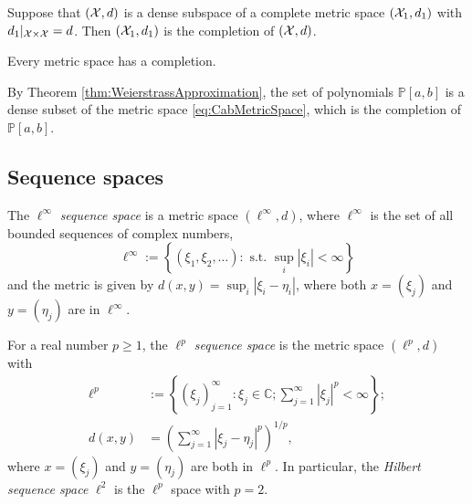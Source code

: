 \begin{lem}
  \label{lem:denseCompletion}
  Suppose that $({\cal X}, d)$ is a dense subspace
  of a complete metric space $({\cal X}_1, d_1)$
  with $d_1|_{{\cal X}\times{\cal X}} = d$.
  Then $({\cal X}_1, d_1)$ is the completion of $({\cal X}, d)$.
\end{lem}

\begin{thm}
  \label{thm:existenceOfMetricCompletion}
  Every metric space has a completion.
\end{thm}

\begin{exm}
  \label{exm:polynomialDenseInCab}
  By Theorem \ref{thm:WeierstrassApproximation}, 
  the set of polynomials $\mathbb{P}[a,b]$
  is a dense subset of the metric space \eqref{eq:CabMetricSpace}, 
  which is the completion of $\mathbb{P}[a,b]$.
\end{exm}

\subsection{Sequence spaces}
\label{sec:metric-spaces-basicAnal}

\begin{defn}
  \label{def:lInftySeqSpace}
  The $\ell^{\infty}$ \emph{sequence space} 
  is a metric space $(\ell^{\infty},d)$,
  where $\ell^{\infty}$ is the set of all bounded sequences
  of complex numbers,
  \begin{equation}
    \label{eq:ellInftySpace}
    \ell^{\infty} := \left\{
      (\xi_1, \xi_2, \ldots):
      \text{ s.t. } \sup_{i}|\xi_i| < \infty
      \right\}
  \end{equation}
  and the metric is given by
  $d(x,y) = \sup_{i}|\xi_i- \eta_i|$, 
  where both $x=(\xi_j)$ and $y=(\eta_j)$ are in $\ell^{\infty}$. 
\end{defn}

\begin{defn}
  \label{def:lpSpace}
  For a real number $p\ge 1$,
   the \emph{$\ell^p$ sequence space} is the metric space $(\ell^p, d)$
   with
  \begin{align}
    \label{eq:lpSpace}
    \ell^p &:= \left\{
               (\xi_j)_{j=1}^{\infty}: \xi_j\in \mathbb{C};
               \sum_{j=1}^{\infty} |\xi_j|^p < \infty
    \right\};
    \\
    \label{eq:lpMetric}
    d(x,y) &= \left(\sum_{j=1}^{\infty} |\xi_j -\eta_j|^p\right)^{1/p},
  \end{align}             
  where $x=(\xi_j)$ and $y=(\eta_j)$ are both in $\ell^p$.
  In particular, the \emph{Hilbert sequence space} $\ell^2$
   is the $\ell^p$ space with $p=2$.
\end{defn}

